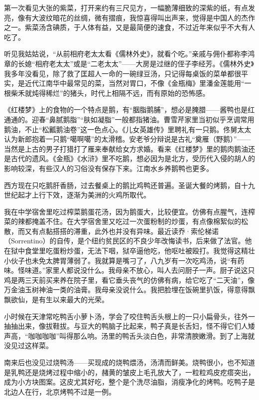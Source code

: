 \par 第一次看见大张的紫菜，打开来约有三尺见方，一幅脆薄细致的深紫的纸，有点发亮，像有大波纹暗花的丝绸，微有摺痕，我惊喜得叫出声来，觉得是中国人的杰作之一。紫菜汤含碘质，于人体有益，又是最简便的速食，不过近年来似乎不大有人吃了。
\par 听见我姑姑说，“从前相府老太太看《儒林外史》，就看个吃。”亲戚与佣仆都称李鸿章的长媳“相府老太太”或是“二老太太”——大房是过继的侄子李经芳。《儒林外史》我多年没看见，除了救了匡超人一命的一碗绿豆汤，只记得每桌饭的菜单都很平实，是近代江南华中最常见的菜，当然对胃口，不像《金瓶梅》里潘金莲能用“一根柴禾就炖得稀烂”的猪头，时代上相隔不远，而有原始的恐怖感。
\par 《红楼梦》上的食物的一个特点是鹅，有“胭脂鹅脯”，想必是腌腊——酱鸭也是红通通的。迎春“鼻腻鹅脂”“肤如凝脂”一般都指猪油。曹雪芹家里当初似乎烹调常用鹅油，不止“松瓤鹅油卷”这一色点心。《儿女英雄传》里聘礼有一只鹅。佟舅太太认为新郎抱着一只鹅“噶啊噶”的太滑稽。安老爷分辩说是古礼“奠雁（野鹅）”——当然是上古的男子打猎打了雁来奉献给女方求婚。看来《红楼梦》里的鹅肉鹅油还是古代的遗风。《金瓶》《水浒》里不吃鹅，想必因为是北方，受历代入侵的胡人的影响较深，有些汉人的习俗没有保存下来。江南水乡养鹅鸭也更多。
\par 西方现在只吃鹅肝香肠，过去餐桌上的鹅比鸡鸭还普遍。圣诞大餐的烤鹅，自十九世纪起才上行下效，逐渐为美洲的火鸡所取代。
\par 我在中学宿舍里吃过榨菜鹅蛋花汤，因为鹅蛋大，比较便宜。仿佛有点腥气，连榨菜的辣都掩盖不住。在大学宿舍里又吃过一次蛋粉制的炒蛋，有点像棉絮似的松散，而又有点黏搭搭的滞重，此外也并没有异味。最近读乔·索伦梯诺（Sorrentino）的自传，是个纽约贫民区的不良少年改悔读书，后来做了法官。他在狱中食堂里吃蛋粉炒蛋，无法下咽，狱卒逼他吃，他呕吐被殴打。我觉得这精壮小伙子也未免太脾胃薄弱了。我就算是嘴刁了，八九岁有一次吃鸡汤，说“有药味。怪味道。”家里人都说没什么。我母亲不放心，叫人去问厨子一声。厨子说这只鸡是两三天前买来养在院子里，看它垂头丧气的仿佛有病，给它吃了“二天油”，像万金油玉树神油一类的油膏。我母亲没说什么。我把脸埋在饭碗里扒饭，得意得飘飘欲仙，是有生以来最大的光荣。
\par 小时候在天津常吃鸭舌小萝卜汤，学会了咬住鸭舌头根上的一只小扁骨头，往外一抽抽出来，像拔鞋拔。与豆大的鸭脑子比起来，鸭子真是长舌妇，怪不得它们人矮声高，“咖咖咖咖”叫得那么响。汤里的鸭舌头淡白色，非常清腴嫩滑。到了上海就没见过这样菜。
\par 南来后也没见过烧鸭汤——买现成的烧鸭煨汤，汤清而鲜美。烧鸭很小，也不知道是乳鸭还是烧烤过程中缩小的，赭黄的皱皮上毛孔放大了，一粒粒鸡皮疙瘩突出，成为小方块图案。这皮尤其好吃，整个是个洗尽油脂，消瘦净化的烤鸭。吃鸭子是北边人在行，北京烤鸭不过是一例。

